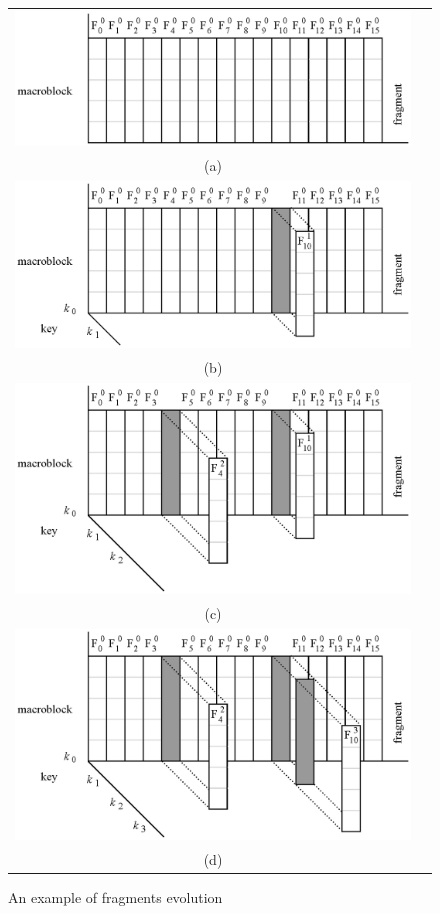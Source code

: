 \begin{figure}[!t]
\centering
\setlength{\tabcolsep}{5pt}
\begin{tabular}{cc}
\includegraphics[width=0.6\columnwidth,valign=t]{figures/fig06a}\\
{\scriptsize (a)}\\
\includegraphics[width=0.6\columnwidth,valign=t]{figures/fig06b}\\
{\scriptsize (b)} \\
\includegraphics[width=0.6\columnwidth,valign=t]{figures/fig06c}\\
{\scriptsize (c)}\\
\includegraphics[width=0.6\columnwidth,valign=t]{figures/fig06d}\\
{\scriptsize (d)}\\
\end{tabular}
\caption{\label{ms:fig:pu}An example of fragments evolution}
\end{figure}

